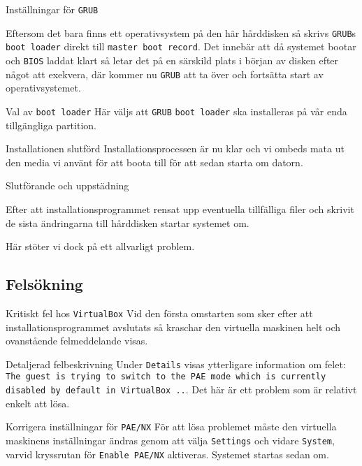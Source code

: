            {Inställningar för \texttt{GRUB}}
           {Eftersom det bara finns ett operativsystem på den här hårddisken så
            skrivs \texttt{GRUB}s \texttt{boot loader} direkt till
            \texttt{master boot record}.
            Det innebär att då systemet bootar och \texttt{BIOS} laddat klart
            så letar det på en särskild plats i början av disken efter något
            att exekvera, där kommer nu \texttt{GRUB} att ta över och fortsätta
            start av operativsystemet.
           {}

           {Val av \texttt{boot loader}}
           {Här väljs att \texttt{GRUB} \texttt{boot loader} ska installeras
            på vår enda tillgängliga partition.}
           {}

           {Installationen slutförd}
           {Installationsprocessen är nu klar och vi ombeds mata ut den media
            vi använt för att boota till för att sedan starta om datorn.}
           {}

           {Slutförande och uppstädning}
           {Efter att installationsprogrammet rensat upp eventuella tillfälliga filer
            och skrivit de sista ändringarna till hårddisken startar systemet om.
            \par Här stöter vi dock på ett allvarligt problem.}
           {}


\subsection{Felsökning}

           {Kritiskt fel hos \texttt{VirtualBox}}
           {Vid den första omstarten som sker efter att installationsprogrammet
            avslutats så kraschar den virtuella maskinen helt och ovanstående
            felmeddelande visas.}
           {}

           {Detaljerad felbeskrivning}
           {Under \texttt{Details} visas ytterligare information om felet:
            \texttt{The guest is trying to switch to the PAE mode which is
            currently disabled by default in VirtualBox ..}. Det här är ett
            problem som är relativt enkelt att lösa.
            }
           {}

           {Korrigera inställningar för \texttt{PAE/NX}}
           {För att lösa problemet måste den virtuella maskinens inställningar
            ändras genom att välja \texttt{Settings} och vidare \texttt{System},
            varvid kryssrutan för \texttt{Enable PAE/NX} aktiveras.
            Systemet startas sedan om.}
           {}


}
